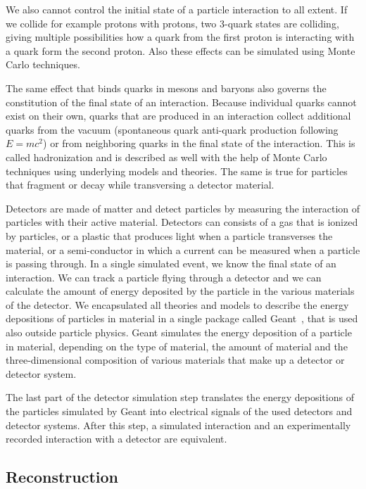 \documentclass{wscpaperproc}
\theoremstyle{wsc}
\begin{document}
We also cannot control the initial state of a particle interaction to all extent. If we collide for example protons with protons, two 3-quark states are colliding, giving multiple possibilities how a quark from the first proton is interacting with a quark form the second proton. Also these effects can be simulated using Monte Carlo techniques.

The same effect that binds quarks in mesons and baryons also governs the constitution of the final state of an interaction. Because individual quarks cannot exist on their own, quarks that are produced in an interaction collect additional quarks from the vacuum (spontaneous quark anti-quark production following $E=mc^2$) or from neighboring quarks in the final state of the interaction. This is called hadronization and is described as well with the help of Monte Carlo techniques using underlying models and theories. The same is true for particles that fragment or decay while transversing a detector material.

Detectors are made of matter and detect particles by measuring the interaction of particles with their active material. Detectors can consists of a gas that is ionized by particles, or a plastic that produces light when a particle transverses the material, or a semi-conductor in which a current can be measured when a particle is passing through. In a single simulated event, we know the final state of an interaction. We can track a particle flying through a detector and we can calculate the amount of energy deposited by the particle in the various materials of the detector. We encapsulated all theories and models to describe the energy depositions of particles in material in a single package called Geant~, that is used also outside particle physics. Geant simulates the energy deposition of a particle in material, depending on the type of material, the amount of material and the three-dimensional composition of various materials that make up a detector or detector system. 

The last part of the detector simulation step translates the energy depositions of the particles simulated by Geant into electrical signals of the used detectors and detector systems. After this step, a simulated interaction and an experimentally recorded interaction with a detector are equivalent.

\subsection{Reconstruction}
\label{subsec:reconstruction}
\end{document}
